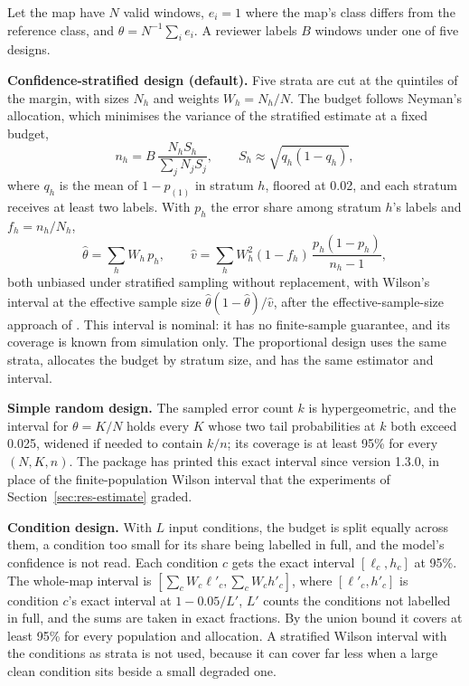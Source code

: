 \documentclass[11pt,a4paper]{article}
\begin{document}
Let the map have $N$ valid windows, $e_i = 1$ where the map's class differs from the reference class, and
$\theta = N^{-1}\sum_i e_i$. A reviewer labels $B$ windows under one of five designs.

\textbf{Confidence-stratified design (default).} Five strata are cut at the quintiles of the margin, with sizes $N_h$
and weights $W_h = N_h/N$. The budget follows Neyman's allocation, which minimises the variance of the stratified
estimate at a fixed budget,
\begin{equation}
  n_h = B \, \frac{N_h S_h}{\sum_j N_j S_j}, \qquad S_h \approx \sqrt{q_h (1 - q_h)},
\end{equation}
where $q_h$ is the mean of $1 - p_{(1)}$ in stratum $h$, floored at 0.02, and each stratum receives at least two
labels. With $p_h$ the error share among stratum $h$'s labels and $f_h = n_h/N_h$,
\begin{equation}
  \hat\theta = \sum_h W_h \, p_h, \qquad
  \hat v = \sum_h W_h^2 (1 - f_h) \, \frac{p_h (1 - p_h)}{n_h - 1},
\end{equation}
both unbiased under stratified sampling without replacement, with Wilson's interval at the effective sample size
$\hat\theta(1-\hat\theta)/\hat v$, after the effective-sample-size approach of \citet{korn1998}. This interval is
nominal: it has no finite-sample guarantee, and its coverage is known from simulation only. The proportional design
uses the same strata, allocates the budget by stratum size, and has the same estimator and interval.

\textbf{Simple random design.} The sampled error count $k$ is hypergeometric, and the interval for $\theta = K/N$ holds
every $K$ whose two tail probabilities at $k$ both exceed 0.025, widened if needed to contain $k/n$; its coverage is at
least 95\% for every $(N, K, n)$. The package has printed this exact interval since version 1.3.0, in place of the
finite-population Wilson interval that the experiments of Section~\ref{sec:res-estimate} graded.

\textbf{Condition design.} With $L$ input conditions, the budget is split equally across them, a condition too small
for its share being labelled in full, and the model's confidence is not read. Each condition $c$ gets the exact
interval $[\ell_c, h_c]$ at 95\%. The whole-map interval is $[\sum_c W_c \ell'_c, \sum_c W_c h'_c]$, where
$[\ell'_c, h'_c]$ is condition $c$'s exact interval at $1 - 0.05/L'$, $L'$ counts the conditions not labelled in full,
and the sums are taken in exact fractions. By the union bound it covers at least 95\% for every population and
allocation. A stratified Wilson interval with the conditions as strata is not used, because it can cover far less when
a large clean condition sits beside a small degraded one.
\end{document}

